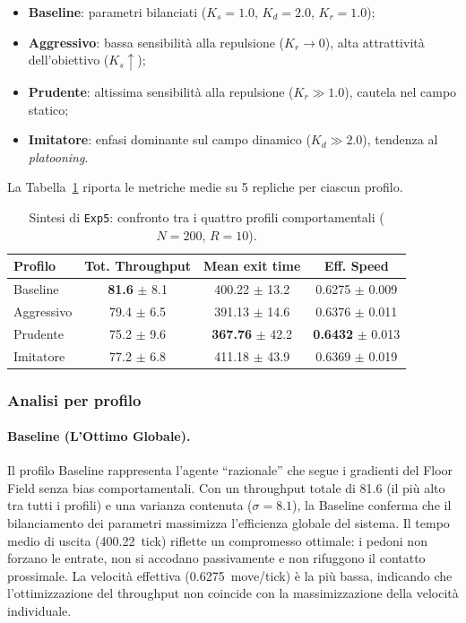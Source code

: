 \begin{itemize}
    \item \textbf{Baseline}: parametri bilanciati ($K_s = 1.0$, $K_d = 2.0$, $K_r = 1.0$);
    \item \textbf{Aggressivo}: bassa sensibilità alla repulsione ($K_r \to 0$), alta attrattività dell'obiettivo ($K_s \uparrow$);
    \item \textbf{Prudente}: altissima sensibilità alla repulsione ($K_r \gg 1.0$), cautela nel campo statico;
    \item \textbf{Imitatore}: enfasi dominante sul campo dinamico ($K_d \gg 2.0$), tendenza al \textit{platooning}.
\end{itemize}

La Tabella~\ref{tab:exp5} riporta le metriche medie su 5 repliche per ciascun profilo.

\begin{table}[H]
\centering
\caption{Sintesi di \texttt{Exp5}: confronto tra i quattro profili comportamentali ($N=200$, $R=10$).}
\label{tab:exp5}
\begin{tabular}{lccc}
\toprule
Profilo & Tot. Throughput & Mean exit time & Eff. Speed \\
\midrule
Baseline   & \textbf{81.6} $\pm$ 8.1 & 400.22 $\pm$ 13.2 & 0.6275 $\pm$ 0.009 \\
Aggressivo & 79.4 $\pm$ 6.5 & 391.13 $\pm$ 14.6 & 0.6376 $\pm$ 0.011 \\
Prudente   & 75.2 $\pm$ 9.6 & \textbf{367.76} $\pm$ 42.2 & \textbf{0.6432} $\pm$ 0.013 \\
Imitatore  & 77.2 $\pm$ 6.8 & 411.18 $\pm$ 43.9 & 0.6369 $\pm$ 0.019 \\
\bottomrule
\end{tabular}
\end{table}

\subsubsection{Analisi per profilo}

\paragraph{Baseline (L'Ottimo Globale).}
Il profilo Baseline rappresenta l'agente ``razionale'' che segue i gradienti del Floor Field senza bias comportamentali. Con un throughput totale di 81.6 (il più alto tra tutti i profili) e una varianza contenuta ($\sigma = 8.1$), la Baseline conferma che il bilanciamento dei parametri massimizza l'efficienza globale del sistema. Il tempo medio di uscita (400.22~tick) riflette un compromesso ottimale: i pedoni non forzano le entrate, non si accodano passivamente e non rifuggono il contatto prossimale. La velocità effettiva (0.6275~move/tick) è la più bassa, indicando che l'ottimizzazione del throughput non coincide con la massimizzazione della velocità individuale.

